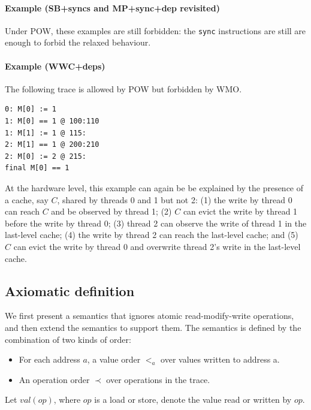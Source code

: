 \documentclass[11pt]{article}
\begin{document}
\paragraph{Example (SB+syncs and MP+sync+dep revisited)} Under POW,
these examples are still forbidden: the \verb!sync! instructions are
still are enough to forbid the relaxed behaviour.

\paragraph{Example (WWC+deps)} The following trace is allowed by POW
but forbidden by WMO.

\begin{verbatim}
0: M[0] := 1
1: M[0] == 1 @ 100:110
1: M[1] := 1 @ 115:
2: M[1] == 1 @ 200:210
2: M[0] := 2 @ 215:
final M[0] == 1
\end{verbatim}

\noindent At the hardware level, this example can again be be
explained by the presence of a cache, say $C$, shared by threads 0 and
1 but not 2: (1) the write by thread 0 can reach $C$ and be
observed by thread 1; (2) $C$ can evict the write by thread 1 before
the write by thread 0; (3) thread 2 can observe the write of thread 1
in the last-level cache; (4) the write by thread 2 can reach the
last-level cache; and (5) $C$ can evict the write by thread 0 and
overwrite thread 2's write in the last-level cache.

\subsection*{Axiomatic definition}

We first present a semantics that ignores atomic read-modify-write
operations, and then extend the semantics to support them.  The
semantics is defined by the combination of two kinds of order:

\begin{itemize}

\item For each address $a$, a value order $<_a$ over values written
to address a.

\item An operation order $\prec$ over operations in the trace.

\end{itemize}

\noindent Let $val(op)$, where $op$ is a load or store, denote the value
read or written by $op$.
\end{document}
